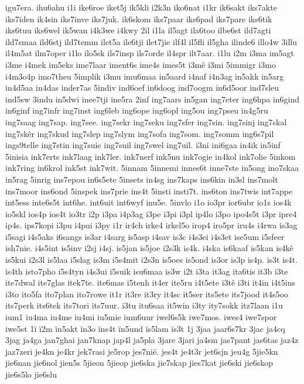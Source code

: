igu7era.
ihu6ahu
i1i
ike6roe
iket5j
ik5kli
i2k3n
iko6nat
i1kr
ik6sakt
iks7akte
iks7iden
ik4sin
iks7inve
iks7juk.
ik6skom
iks7paar
iks6pad
iks7pare
iks6tik
iks6tuu
iks6wel
ik5wan
i4k3we
i4kwy
2il
i1la
il5agt
ila6too
ilbe6st
ild7agti
ild7smaa
ild6stj
ild7temm
ilet5a
ile6tji
ilet7jie
ilf4l
il5fli
il5gha
ilinde6
illo4w
3illu
il4m5at
ilm7oper
i1lo
ilo5sk
ils7insp
ils7orde
il4spr
ilt7aar.
i1lu
i2m
i3ma
im5agt
i3me
i4mek
im5eks
ime7laar
iment6s
ime4s
imes5t
i3mê
i3mi
5immigr
i3mo
i4m3o4p
imo7theu
5implik
i3mu
imu6maa
in5aard
i4naf
i4n3ag
in5akk
in5arg
in4d5aa
in4das
inder7as
5indiv
ind6oef
in6doog
ind7oogm
in6d5oor
ind7sleu
ind5sw
3indu
in5dwi
inee7tji
ine5ra
2inf
ing7aars
in5gan
ing7eter
ing6hpa
in6gind
in6ginf
ing7infr
ing7inst
ing6leb
ing6ope
ing6opl
ing5ou
ing7pseu
in4g5ru
ing7saag
ing7sap.
ing7see.
ing7sekr
ing7seku
ing7sfer
ing7sin.
ing7sinj
ing7skal
ing7skêr
ing7skud
ing7slep
ing7slym
ing7sofa
ing7som.
ing7somm
ing6s7pil
ings9telle
ing7stin
ing7suie
ing7suil
ing7swel
ing7uil.
i3ni
ini6gaa
in4ik
in5inf
5inisia
ink7erts
ink7laag
ink7ler.
ink7nerf
ink5nu
ink7ogie
in4kol
ink7olie
5inkom
ink7ring
in6krol
ink5st
ink7wit.
5innam
5innemi
innes6t
inne7ste
in5ong
ino7skaa
in5rag
5inrig
ins7epou
in6s5ete
5insets
in4sg
ins7kaps
ins6kin
in3sl
ins7molt
ins7moor
ins6ond
5inspek
ins7prie
ins4t
5insti
insti7t.
ins6ton
ins7twis
int7appe
int5ess
inte6s5t
int6he.
int6uit
int6wyf
inu5e.
5invlo
i1o
io3pr
ior6ubr
io1s
ios4k
io5skl
ios4p
ios4t
io3tr
i2p
i3pa
i4p3ag
i3pe
i3pi
i3pl
ip4lo
i3po
ipo4s5t
i3pr
ipre4
ip4s.
ips7kopi
i3pu
i4pui
i3py
i1r
ir4ch
irke4
irkel5o
irop4
iro5pr
iru4s
i4rwa
is3ag
i5sagi
i4s5aks
i6sangs
is3ar
i4sarg
is5asp
i4sav
is3c
i4s3ei
i4s3et
ise5um
i5sfeer
ish7nie.
i4s5int
is5inv
i2sj
i4sj.
is5jan
is5joe
i2s3k
is4k.
i4ska
is6kaaf
is5kan
is4kê
is5kui
i2s3l
is5laa
i5slag
is3m
i5s4mit
i2s3n
is5oes
is5ond
is3or
is3p
is4p.
is3t
is4t.
is4th
isto7pho
i5s4tyn
i4s3ui
i5suik
isu6maa
is3w
i2t
i3ta
it3ag
ita6tis
it3b
i3te
ite7dwal
ite7glas
itek7te.
ite6mas
i5tenh
it4er
ite5ru
i4t5ete
i3tê
i3ti
it4in
i4t5ins
i3to
ito5fa
ito7plan
ito7rowe
it1r
it3re
it3ry
it4sc
it5ser
its5ete
its7jood
it4s5oo
its7perk
its6tek
its7tori
its7uur.
i3tu
itu6saa
it5win
i3ty
ity7sokk
itz7laan
i1u
ium1
iu4ma
iu4me
iu4mi
iu5mie
ium6uur
iwel6s5k
iwe7mos.
iwes4
iwe7spor
iwe5st
1ï
ï2m
ïn5akt
ïn3o
ïns4t
ïn5und
ïs5lam
ïs3t
1j
3jaa
jaar6s7kr
3jac
ja4cq
3jag
ja4ga
jan7ghai
jan7knap
jap4l
ja5pla
3jare
3jari
ja4sm
jas7pant
jas6tas
jaz4z
jaz7zeri
je4kn
je4kr
jek7rasi
je5rop
jes7nië.
jes4t
je4t3r
jet6sjn
jeu4g
5jie5kn
jie6nan
jie6nol
jien5s
5jieon
5jieop
jie6ska
jie7skap
jies7kat
jie6ski
jie6skop
jie6s5lo
jie6slu
